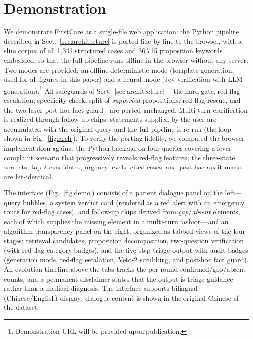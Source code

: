 
\section{Demonstration}\label{sec:demo}

We demonstrate FirstCare as a single-file web application: the Python
pipeline described in Sect.~\ref{sec:architecture} is ported line-by-line to
the browser, with a slim corpus of all 1{,}341 structured cases and 36{,}715
proposition keywords embedded, so that the full pipeline runs offline in the
browser without any server. Two modes are provided: an offline deterministic
mode (template generation, used for all figures in this paper) and a neural
mode (Jev verification with LLM generation).\footnote{Demonstration URL will
be provided upon publication.} All safeguards of Sect.~\ref{sec:architecture}
---the hard gate, red-flag escalation, specificity check, split of
\textit{supported} propositions, red-flag rescue, and the two-layer post-hoc
fact guard---are ported unchanged. Multi-turn clarification is realized
through follow-up chips: statements supplied by the user are accumulated with
the original query and the full pipeline is re-run (the loop shown in
Fig.~\ref{fig:arch}). To verify the porting fidelity, we compared the browser
implementation against the Python backend on four queries covering a
fever-complaint scenario that progressively reveals red-flag features; the
three-state verdicts, top-2 candidates, urgency levels, cited cases, and
post-hoc audit marks are bit-identical.

The interface (Fig.~\ref{fig:demo}) consists of a patient dialogue panel on
the left---query bubbles, a system verdict card (rendered as a red alert with
an emergency route for red-flag cases), and follow-up chips derived from
\textit{gap}/\textit{absent} elements, each of which supplies the missing
element in a multi-turn fashion---and an algorithm-transparency panel on the
right, organized as tabbed views of the four stages: retrieval candidates,
proposition decomposition, two-question verification (with red-flag category
badges), and the five-step triage output with audit badges (generation mode,
red-flag escalation, Veto-2 scrubbing, and post-hoc fact guard). An evolution
timeline above the tabs tracks the per-round confirmed/gap/absent counts, and
a permanent disclaimer states that the output is triage guidance rather than a
medical diagnosis. The interface supports bilingual (Chinese/English) display;
dialogue content is shown in the original Chinese of the dataset.


